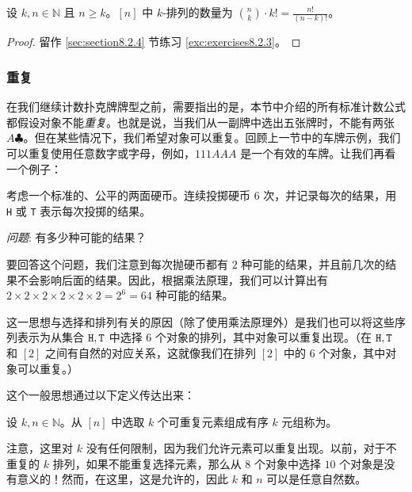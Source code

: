 \begin{proposition}\label{prop:proposition8.2.18}
    设 $k, n \in \mathbb{N}$ 且 $n \ge k$。$[n]$ 中 $k$-排列的数量为 ${n \choose k} \cdot k! = \frac{n!}{(n-k)!}$。
\end{proposition}

\begin{proof}
    留作 \ref{sec:section8.2.4} 节练习 \ref{exc:exercises8.2.3}。
\end{proof}

\subsubsection*{重复}

在我们继续计数扑克牌牌型之前，需要指出的是，本节中介绍的所有标准计数公式都假设对象不能\emph{重复}。也就是说，当我们从一副牌中选出五张牌时，不能有两张 $A \clubsuit$。但在某些情况下，我们希望对象可以重复。回顾上一节中的车牌示例，我们可以重复使用任意数字或字母，例如，$111AAA$ 是一个有效的车牌。让我们再看一个例子：\\

\begin{example}
    考虑一个标准的、公平的两面硬币。连续投掷硬币 $6$ 次，并记录每次的结果，用 \verb|H| 或 \verb|T| 表示每次投掷的结果。

    \emph{问题}: 有多少种可能的结果？

    要回答这个问题，我们注意到每次抛硬币都有 $2$ 种可能的结果，并且前几次的结果不会影响后面的结果。因此，根据乘法原理，我们可以计算出有 $2 \times 2 \times 2 \times 2 \times 2 \times 2 = 2^6 = 64$ 种可能的结果。
\end{example}

这一思想与选择和排列有关的原因（除了使用乘法原理外）是我们也可以将这些序列表示为从集合 ${\verb|H|, \verb|T|}$ 中选择 $6$ 个对象的排列，其中对象可以重复出现。（在 ${\verb|H|, \verb|T|}$ 和 $[2]$ 之间有自然的对应关系，这就像我们在排列 $[2]$ 中的 $6$ 个对象，其中对象可以重复。）

这个一般思想通过以下定义传达出来：

\begin{definition}
    设 $k, n \in \mathbb{N}$。从 $[n]$ 中选取 $k$ 个可重复元素组成有序 $k$ 元组称为。
\end{definition}

注意，这里对 $k$ 没有任何限制，因为我们允许元素可以重复出现。以前，对于不重复的 $k$ 排列，如果不能重复选择元素，那么从 $8$ 个对象中选择 $10$ 个对象是没有意义的！然而，在这里，这是允许的，因此 $k$ 和 $n$ 可以是任意自然数。

